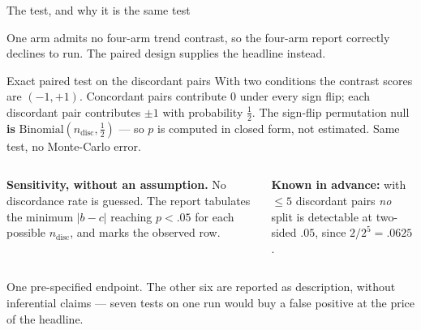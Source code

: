 \documentclass[aspectratio=169,11pt]{beamer}
\begin{document}
\begin{frame}{The test, and why it is the same test}

One arm admits no four-arm trend contrast, so the four-arm report correctly declines to
run. The paired design supplies the headline instead.

\begin{block}{Exact paired test on the discordant pairs}
With two conditions the contrast scores are $(-1,+1)$. Concordant pairs contribute $0$
under every sign flip; each discordant pair contributes $\pm 1$ with probability
$\tfrac12$. The sign-flip permutation null \textbf{is}
$\mathrm{Binomial}(n_{\text{disc}},\tfrac12)$ --- so $p$ is computed in closed form, not
estimated. Same test, no Monte-Carlo error.
\end{block}

\begin{columns}[t]
\small
\textbf{Sensitivity, without an assumption.}
No discordance rate is guessed. The report tabulates the minimum $|b-c|$ reaching
$p<.05$ for each possible $n_{\text{disc}}$, and marks the observed row.

\small
\textbf{Known in advance:} with $\leq 5$ discordant pairs \emph{no} split is detectable
at two-sided $.05$, since $2/2^{5} = .0625$.
\end{columns}

\vfill
{\footnotesize\textcolor{inkfaint}{One pre-specified endpoint. The other six are reported
as description, without inferential claims --- seven tests on one run would buy a false
positive at the price of the headline.}}

\end{frame}

\end{document}

